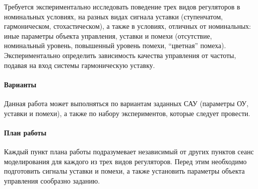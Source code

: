Требуется экспериментально исследовать поведение трех видов
регуляторов в номинальных условиях, на разных видах сигнала уставки
(ступенчатом, гармоническом, стохастическом), а также в условиях,
отличных от номинальных: иные параметры объекта управления, уставки и
помехи (отсутствие, номинальный уровень, повышенный уровень помехи,
``цветная'' помеха).  Экспериментально определить зависимость качества
управления от частоты, подавая на вход системы гармоническую уставку.

\paragraph{Варианты}

Данная работа может выполняться по вариантам заданных САУ (параметры
ОУ, уставки и помехи), а также по набору экспериментов, которые
следует провести.

\paragraph{План работы}

Каждый пункт плана работы подразумевает независимый от других пунктов
сеанс моделирования для каждого из трех видов регуляторов.  Перед этим
необходимо подготовить сигналы уставки и помехи, а также установить
параметры объекта управления сообразно заданию.

